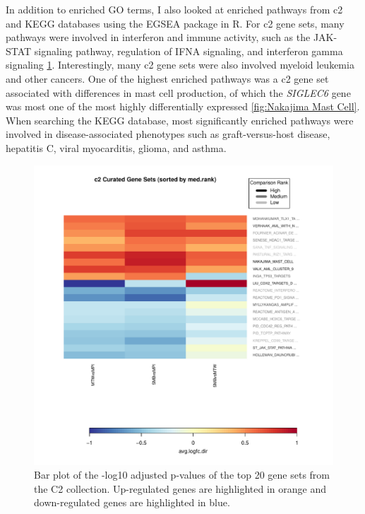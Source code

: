\documentclass[12pt,a4paper,titlepage,twoside,openright]{book}
\begin{document}
\begin{mainmatter}
{In addition to enriched GO terms, I also looked at enriched pathways from c2 and KEGG databases using the EGSEA package in R. For c2 gene sets, many pathways were involved in interferon and immune activity, such as the JAK-STAT signaling pathway, regulation of IFNA signaling, and interferon gamma signaling \ref{fig:c2 Heatmap}. Interestingly, many c2 gene sets were also involved myeloid leukemia and other cancers. One of the highest enriched pathways was a c2 gene set associated with differences in mast cell production, of which the \textit{SIGLEC6} gene was most one of the most highly differentially expressed \ref{fig:Nakajima Mast Cell}. When searching the KEGG database, most significantly enriched pathways were involved in disease-associated phenotypes such as graft-versus-host disease, hepatitis C, viral myocarditis, glioma, and asthma. 

\begin{figure}[htb!]
\centering
\includegraphics[width=\textwidth,height=\textheight,keepaspectratio]{Figures/summary_heatmaps_c2.pdf}
\caption{Bar plot of the -log10 adjusted p-values of the top 20 gene sets from the C2 collection. Up-regulated genes are highlighted in orange and down-regulated genes are highlighted in blue.}
\label{fig:c2 Heatmap}
\end{figure}

}
\end{mainmatter}
\end{document}

